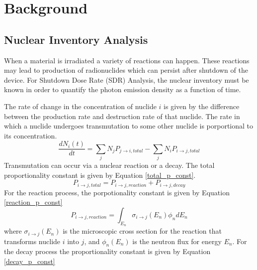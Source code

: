 \section{Background}


\subsection{Nuclear Inventory Analysis}
When a material is irradiated a variety of reactions can happen. These 
reactions may lead to production of radionuclides which can persist
after shutdown of the device. For Shutdown Dose Rate (SDR) Analysis, 
the nuclear inventory must be known
in order to quantify the photon emission density as a function of time.

The rate of change in the concentration of nuclide $i$ is given by the 
difference between the production rate and destruction rate of that nuclide.
The rate in which a nuclide undergoes transmutation to some other nuclide
is porportional to its concentration. 
\begin{equation}\label{rate_change_i}
  \frac{dN_{i}(t)}{dt} = \sum_{j} N_{j}P_{j \rightarrow i, total}
  - \sum_{j} N_{i}P_{i \rightarrow j, total}
\end{equation}
Transmutation can occur via a nuclear reaction or a decay. The total
proportionality constant is given by Equation \ref{total_p_const}.
\begin{equation}\label{total_p_const}
  P_{i \rightarrow j, total} = P_{i \rightarrow j, reaction } +
  P_{i \rightarrow j, decay}
\end{equation}
For the reaction process, the porpotionality constant is given by
Equation \ref{reaction_p_const}
\begin{equation}\label{reaction_p_const}
  P_{i \rightarrow j, reaction } =
  \int_{E_{n}} \sigma_{i \rightarrow j}(E_{n})
  \phi_{n}dE_{n}
\end{equation}
where $\sigma_{i \rightarrow j}(E_{n})$ is the microscopic cross
section for the reaction that transforms nuclide $i$ into $j$, and
 $\phi_{n}(E_{n})$ is the neutron flux for energy $E_{n}$.
For the decay process the proportionality constant is given by Equation
\ref{decay_p_const}

